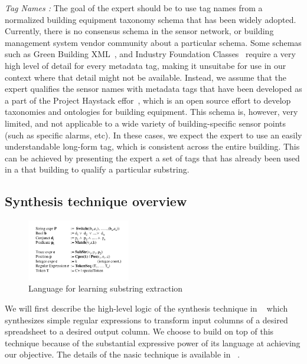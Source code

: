 {\it Tag Names :} The goal of the expert should be to use tag names from a normalized building equipment taxonomy schema that has been widely adopted. Currently, there is no consensus schema in the sensor network, or building management system vendor community about a particular schema. Some schemas such as Green Building XML~\cite{GBXML}, and Industry Foundation Classes~\cite{IFC} require a very high level of detail for every metadata tag, making it unsuitabe for use in our context where that detail might not be available. Instead, we assume that the expert qualifies the sensor names with metadata tags that have been developed as a part of the Project Haystack effor~\cite{haystack}, which is an open source effort to develop taxonomies and ontologies for building equipment. This schema is, however, very limited, and not applicable to a wide variety of building-specific sensor points (such as specific alarms, etc). In these cases, we expect the expert to use an easily understandable long-form tag, which is consistent across the entire building. This can be achieved by presenting the expert a set of tags that has already been used in a that building to qualify a particular substring. 


\subsection{Synthesis technique overview}
\label{sec:synth}

\begin{figure}[h!]
  
  \centering
    \includegraphics[width=0.4\textwidth]{figs/stringLanguage.pdf}
\caption{Language for learning substring extraction}
\label{fig:language}
\end{figure}


We will first describe the high-level logic of the synthesis technique in ~\cite{Gulwani:2011} which synthesizes simple regular expressions to transform input columns of a desired spreadsheet to a desired output column. We choose to build on top of this technique because of the substantial expressive power of its language at achieving our objective. The details of the nasic technique is available in ~\cite{Gulwani:2011}. 

